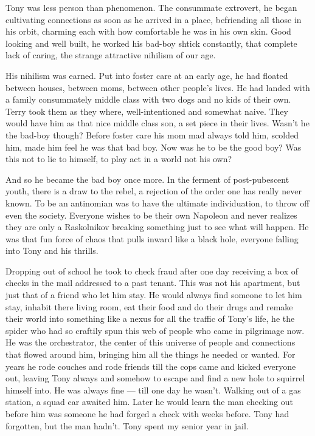 \documentclass[ebook, 10pt, openright, onecolumn]{memoir}
\begin{document}
Tony was less person than phenomenon.  The consummate extrovert, he began
cultivating connections as soon as he arrived in a place, befriending all those
in his orbit, charming each with how comfortable he was in his own skin.  Good
looking and well built, he worked his bad-boy shtick constantly, that complete
lack of caring, the strange attractive nihilism of our age.  

His nihilism was earned.  Put into foster care at an early age, he had floated
between houses, between moms, between other people's lives.  He had landed with
a family consummately middle class with two dogs and no kids of their own.
Terry took them as they where, well-intentioned and somewhat naive.  They would
have him as that nice middle class son, a set piece in their lives.  Wasn't he
the bad-boy though?  Before foster care his mom mad always told him, scolded
him, made him feel he was that bad boy.  Now was he to be the good boy?  Was
this not to lie to himself, to play act in a world not his own?

And so he became the bad boy once more.  In the ferment of post-pubescent youth,
there is a draw to the rebel, a rejection of the order one has really never
known.  To be an antinomian was to have the ultimate individuation, to throw off
even the society.  Everyone wishes to be their own Napoleon and never realizes
they are only a Raskolnikov breaking something just to see what will happen. He
was that fun force of chaos that pulls inward like a black hole, everyone
falling into Tony and his thrills.

Dropping out of school he took to check fraud after one day receiving a box of
checks in the mail addressed to a past tenant.  This was not his apartment, but
just that of a friend who let him stay. He would always find someone to let him
stay, inhabit there living room, eat their food and do their drugs and remake
their world into something like a nexus for all the traffic of Tony's life, he
the spider who had so craftily spun this web of people who came in pilgrimage
now.  He was the orchestrator, the center of this universe of people and
connections that flowed around him, bringing him all the things he needed or
wanted.  For years he rode couches and rode friends till the cops came and
kicked everyone out, leaving Tony always and somehow to escape and find a new
hole to squirrel himself into.  He was always fine --- till one day he wasn't.
Walking out of a gas station, a squad car awaited him.  Later he would learn
the man checking out before him was someone he had forged a check with weeks
before.  Tony had forgotten, but the man hadn't.  Tony spent my senior year in
jail.
\end{document}
